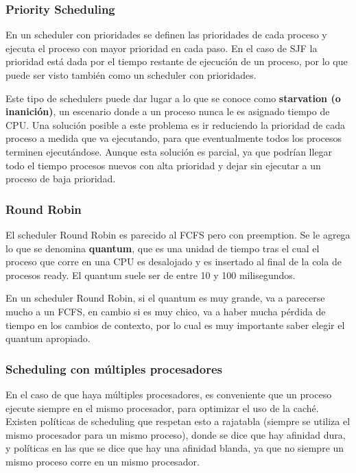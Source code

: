 \documentclass{article}
\begin{document}
\subsubsection{Priority Scheduling}

En un scheduler con prioridades se definen las prioridades de cada proceso y ejecuta el proceso con mayor prioridad en cada paso. En el caso de SJF la prioridad est\'a dada por el tiempo restante de ejecuci\'on de un proceso, por lo que puede ser visto tambi\'en como un scheduler con prioridades.

Este tipo de schedulers puede dar lugar a lo que se conoce como \textbf{starvation (o inanici\'on)}, un escenario donde a un proceso nunca le es asignado tiempo de CPU. Una soluci\'on posible a este problema es ir reduciendo la prioridad de cada proceso a medida que va ejecutando, para que eventualmente todos los procesos terminen ejecut\'andose. Aunque esta soluci\'on es parcial, ya que podr\'ian llegar todo el tiempo procesos nuevos con alta prioridad y dejar sin ejecutar a un proceso de baja prioridad.

\subsubsection{Round Robin}

El scheduler Round Robin es parecido al FCFS pero con preemption. Se le agrega lo que se denomina \textbf{quantum}, que es una unidad de tiempo tras el cual el proceso que corre en una CPU es desalojado y es insertado al final de la cola de procesos ready. El quantum suele ser de entre 10 y 100 milisegundos.

En un scheduler Round Robin, si el quantum es muy grande, va a parecerse mucho a un FCFS, en cambio si es muy chico, va a haber mucha p\'erdida de tiempo en los cambios de contexto, por lo cual es muy importante saber elegir el quantum apropiado.

\subsubsection{Scheduling con m\'ultiples procesadores}

En el caso de que haya m\'ultiples procesadores, es conveniente que un proceso ejecute siempre en el mismo procesador, para optimizar el uso de la cach\'e. Existen pol\'iticas de scheduling que respetan esto a rajatabla (siempre se utiliza el mismo procesador para un mismo proceso), donde se dice que hay afinidad dura, y pol\'iticas en las que se dice que hay una afinidad blanda, ya que no siempre un mismo proceso corre en un mismo procesador.
\end{document}

